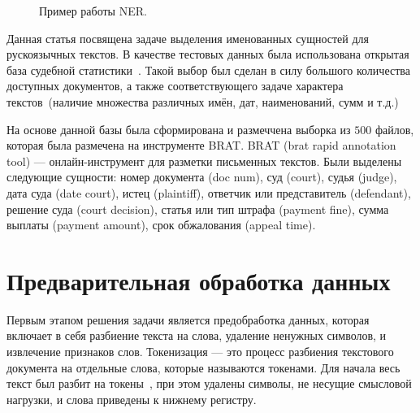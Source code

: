 \documentclass{csmathnotes}
\begin{document}
\begin{figure}[h]
    \caption{Пример работы NER.}
    \label{fig:ner}
\end{figure}


Данная статья посвящена задаче выделения именованных сущностей для рускоязычных текстов.
В качестве тестовых данных была использована открытая база судебной статистики~\cite{CourtsData}.
Такой выбор был сделан в силу большого количества доступных документов, а также соответствующего задаче характера текстов~(наличие множества различных имён, дат, наименований, сумм и т.д.)

На основе данной базы была сформирована и размеччена выборка из $500$ файлов, которая была размечена на инструменте BRAT. BRAT (brat rapid annotation tool) — онлайн-инструмент для разметки письменных текстов. Были выделены следующие сущности: номер документа (doc num), суд (court), судья (judge), дата суда (date court), истец (plaintiff), ответчик или представитель (defendant), решение суда (court decision), статья или тип штрафа (payment fine), сумма выплаты (payment amount), срок обжалования (appeal time).


\section*{Предварительная обработка данных}
Первым этапом решения задачи является предобработка данных, которая включает в себя разбиение текста на слова, удаление ненужных символов, и извлечение признаков слов. 
Токенизация — это процесс разбиения текстового документа на отдельные слова, которые называются токенами.
Для начала весь текст был разбит на токены~\cite{ner}, при этом удалены символы, не несущие смысловой нагрузки, и слова приведены к нижнему регистру.
\end{document}
